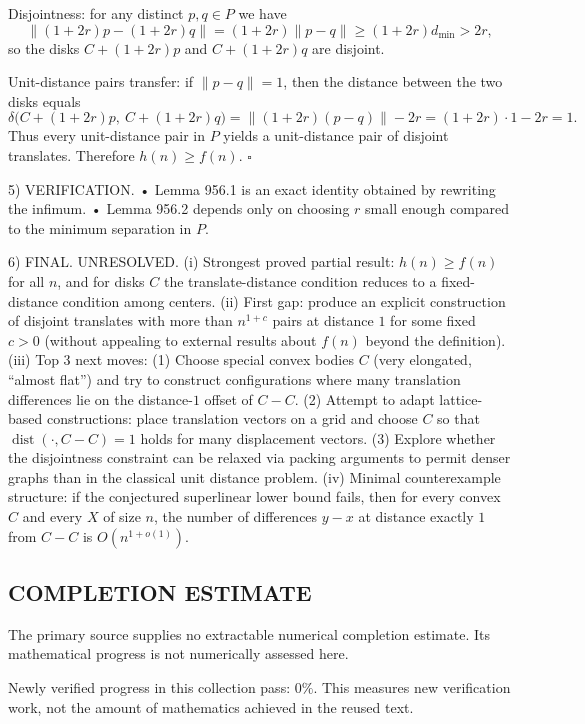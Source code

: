 Disjointness: for any distinct $p,q\in P$ we have
\[\|(1+2r)p-(1+2r)q\|=(1+2r)\|p-q\|\ge (1+2r)d_{\min}>2r,\]
so the disks $C+(1+2r)p$ and $C+(1+2r)q$ are disjoint.

Unit-distance pairs transfer: if $\|p-q\|=1$, then the distance between the two disks equals
\[\delta\bigl(C+(1+2r)p,\ C+(1+2r)q\bigr)=\|(1+2r)(p-q)\|-2r=(1+2r)\cdot 1-2r=1.\]
Thus every unit-distance pair in $P$ yields a unit-distance pair of disjoint translates.
Therefore $h(n)\ge f(n)$.
\hfill $\square$

5) VERIFICATION.
• Lemma 956.1 is an exact identity obtained by rewriting the infimum.
• Lemma 956.2 depends only on choosing $r$ small enough compared to the minimum separation in $P$.

6) FINAL.
UNRESOLVED.
(i) Strongest proved partial result: $h(n)\ge f(n)$ for all $n$, and for disks $C$ the translate-distance condition reduces to a fixed-distance condition among centers.
(ii) First gap: produce an explicit construction of disjoint translates with more than $n^{1+c}$ pairs at distance $1$ for some fixed $c>0$ (without appealing to external results about $f(n)$ beyond the definition).
(iii) Top 3 next moves:
  (1) Choose special convex bodies $C$ (very elongated, “almost flat”) and try to construct configurations where many translation differences lie on the distance-$1$ offset of $C-C$.
  (2) Attempt to adapt lattice-based constructions: place translation vectors on a grid and choose $C$ so that $\operatorname{dist}(\cdot,C-C)=1$ holds for many displacement vectors.
  (3) Explore whether the disjointness constraint can be relaxed via packing arguments to permit denser graphs than in the classical unit distance problem.
(iv) Minimal counterexample structure: if the conjectured superlinear lower bound fails, then for every convex $C$ and every $X$ of size $n$, the number of differences $y-x$ at distance exactly $1$ from $C-C$ is $O(n^{1+o(1)})$.




\subsection*{COMPLETION ESTIMATE}
The primary source supplies no extractable numerical completion estimate. Its mathematical progress is not numerically assessed here.

Newly verified progress in this collection pass: $0\%$. This measures new verification work, not the amount of mathematics achieved in the reused text.
